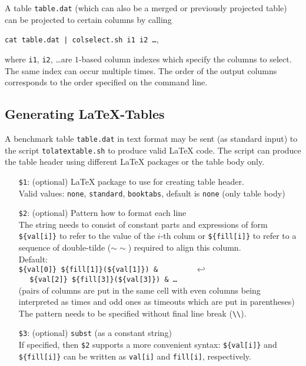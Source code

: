 \documentclass[a4paper]{article}
\begin{document}
			A table {\tt table.dat} (which can also be a merged or previously projected table) can be projected
			to certain columns by calling
			\begin{center}
				{\tt cat table.dat | colselect.sh i1 i2 \ldots},
			\end{center}
			where {\tt i1}, {\tt i2}, \ldots are $1$-based column indexes
			which specify the columns to select. The same index can occur multiple times.
			The order of the output columns corresponds to the order specified on the command line.

		\subsection{Generating \LaTeX-Tables}

			A benchmark table {\tt table.dat} in text format
			may be sent (as standard input) to the script {\tt tolatextable.sh} to produce valid \LaTeX{} code.
			The script can produce the table header using different \LaTeX{} packages or the table body only.

			\medskip{}
			\begin{itemize}
				\item[{\tt \$1}:] (optional) \LaTeX{} package to use for creating table header. \\
					Valid values: {\tt none}, {\tt standard}, {\tt booktabs}, default is {\tt none} (only table body)
				\item[{\tt \$2}:] (optional) Pattern how to format each line \\
					The string needs to consist of constant parts and expressions of form
					{\tt \$\{val[i]\}} to refer to the value of the $i$-th colum
					or {\tt \$\{fill[i]\}} to refer to a sequence of double-tilde ($\sim\sim$) required to align this column. \\
					Default: \\
					{\tt \$\{val[0]\} \$\{fill[1]\}(\$\{val[1]\}) \& $~~~~~~~~~~~~~~~~~~\hookleftarrow$ \\
					$~~~~~~$\$\{val[2]\} \$\{fill[3]\}(\$\{val[3]\}) \& \ldots} \\
					(pairs of columns are put in the same cell with even columns being interpreted as times
					and odd ones as timeouts which are put in parentheses) \\
					The pattern needs to be specified without final line break ({\tt \textbackslash\textbackslash}).
				\item[{\tt \$3}:] (optional) {\tt subst} (as a constant string) \\
					If specified, then {\tt \$2} supports a more convenient syntax: {\tt \$\{val[i]\}} and {\tt \$\{fill[i]\}} can be written as {\tt val[i]} and {\tt fill[i]}, respectively.
			\end{itemize}
\end{document}
